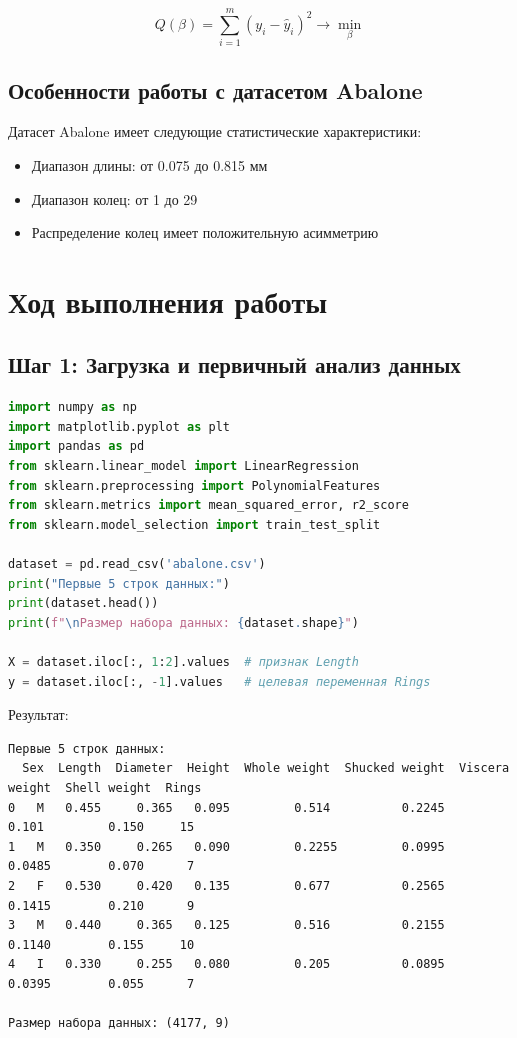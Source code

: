 \begin{equation}
Q(\beta) = \sum_{i=1}^m \left( y_i - \hat{y}_i \right)^2 \rightarrow \min_{\beta}
\label{eq:loss}
\end{equation}

\subsection{Особенности работы с датасетом Abalone}

Датасет Abalone имеет следующие статистические характеристики:

\begin{itemize}
    \item Диапазон длины: от 0.075 до 0.815 мм
    \item Диапазон колец: от 1 до 29
    \item Распределение колец имеет положительную асимметрию
\end{itemize}

\section{Ход выполнения работы}

\subsection{Шаг 1: Загрузка и первичный анализ данных}

\begin{lstlisting}[language=Python, caption=Загрузка и анализ данных Abalone]
import numpy as np
import matplotlib.pyplot as plt
import pandas as pd
from sklearn.linear_model import LinearRegression
from sklearn.preprocessing import PolynomialFeatures
from sklearn.metrics import mean_squared_error, r2_score
from sklearn.model_selection import train_test_split

dataset = pd.read_csv('abalone.csv')
print("Первые 5 строк данных:")
print(dataset.head())
print(f"\nРазмер набора данных: {dataset.shape}")

X = dataset.iloc[:, 1:2].values  # признак Length
y = dataset.iloc[:, -1].values   # целевая переменная Rings
\end{lstlisting}

Результат:

\begin{verbatim}
Первые 5 строк данных:
  Sex  Length  Diameter  Height  Whole weight  Shucked weight  Viscera weight  Shell weight  Rings
0   M   0.455     0.365   0.095         0.514          0.2245           0.101         0.150     15
1   M   0.350     0.265   0.090         0.2255         0.0995          0.0485        0.070      7
2   F   0.530     0.420   0.135         0.677          0.2565          0.1415        0.210      9
3   M   0.440     0.365   0.125         0.516          0.2155          0.1140        0.155     10
4   I   0.330     0.255   0.080         0.205          0.0895          0.0395        0.055      7

Размер набора данных: (4177, 9)
\end{verbatim}

